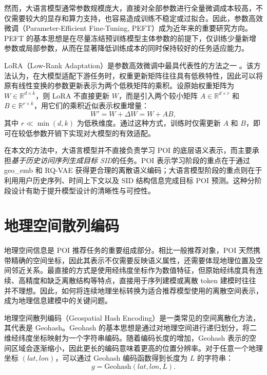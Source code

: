 然而，大语言模型通常参数规模庞大，直接对全部参数进行全量微调成本较高，不仅需要较大的显存和算力支持，也容易造成训练不稳定或过拟合。因此，参数高效微调（Parameter-Efficient Fine-Tuning, PEFT）成为近年来的重要研究方向。PEFT 的基本思想是在尽量冻结预训练模型主体参数的前提下，仅训练少量新增参数或局部参数，从而在显著降低训练成本的同时保持较好的任务适应能力。

LoRA（Low-Rank Adaptation）是参数高效微调中最具代表性的方法之一 \cite {hu2022lora}。该方法认为，在大模型适配下游任务时，权重更新矩阵往往具有低秩特性，因此可以将原有线性变换的参数更新表示为两个低秩矩阵的乘积。设原始权重矩阵为 $W \in \mathbb{R}^{d \times k}$，则 LoRA 不直接更新 $W$，而是引入两个较小矩阵 $A \in \mathbb{R}^{d \times r}$ 和 $B \in \mathbb{R}^{r \times k}$，用它们的乘积近似表示权重增量：
\begin{equation}
W' = W + \Delta W = W + AB,
\end{equation}
其中 $r \ll \min(d,k)$ 为低秩维度。通过这种方式，训练时仅需更新 $A$ 和 $B$，即可在较低参数开销下实现对大模型的有效适配。


在本文的方法中，大语言模型并不直接负责学习 POI 的底层语义表示，而主要承担\emph{基于历史访问序列生成目标 SID}的任务。POI 表示学习阶段的重点在于通过 geo\_emb 和 RQ-VAE 获得更合理的离散语义编码；大语言模型阶段的重点则在于利用用户历史序列、时间上下文以及 SID 结构信息完成目标 POI 预测。这种分阶段设计有助于提升模型设计的清晰性与可控性。

\section{地理空间散列编码}
\label{sec:geohash}

地理空间信息是 POI 推荐任务的重要组成部分。相比一般推荐对象，POI 天然携带精确的空间坐标，因此其表示不仅需要反映语义属性，还需要体现地理位置及空间邻近关系。最直接的方式是使用经纬度坐标作为数值特征，但原始经纬度具有连续、高精度和缺乏离散结构等特点，直接用于序列建模或离散 token 建模时往往并不理想。因此，如何将连续地理坐标转换为适合推荐模型使用的离散空间表示，成为地理信息建模中的关键问题。

地理空间散列编码（Geospatial Hash Encoding）是一类常见的空间离散化方法，其代表是 Geohash。Geohash 的基本思想是通过对地理空间进行递归划分，将二维经纬度坐标映射为一个字符串编码。随着编码长度的增加，Geohash 表示的空间区域会逐渐缩小，因此更长的编码意味着更高的位置分辨率。对于任意一个地理坐标 $(lat, lon)$，可以通过 Geohash 编码函数得到长度为 $L$ 的字符串：
\begin{equation}
g = \mathrm{Geohash}(lat, lon, L).
\end{equation}

